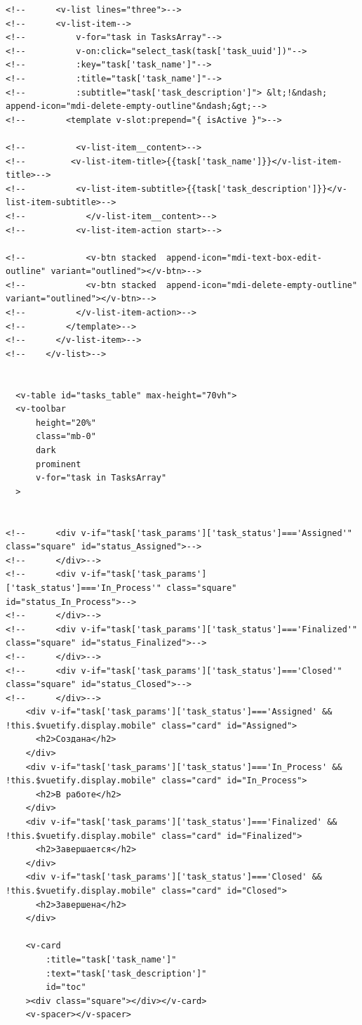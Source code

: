 \documentclass{altsu-report}
\begin{document}
\begin{code}
\begin{verbatim}
<!--      <v-list lines="three">-->
<!--      <v-list-item-->
<!--          v-for="task in TasksArray"-->
<!--          v-on:click="select_task(task['task_uuid'])"-->
<!--          :key="task['task_name']"-->
<!--          :title="task['task_name']"-->
<!--          :subtitle="task['task_description']"> &lt;!&ndash;  append-icon="mdi-delete-empty-outline"&ndash;&gt;-->
<!--        <template v-slot:prepend="{ isActive }">-->

<!--          <v-list-item__content>-->
<!--         <v-list-item-title>{{task['task_name']}}</v-list-item-title>-->
<!--          <v-list-item-subtitle>{{task['task_description']}}</v-list-item-subtitle>-->
<!--            </v-list-item__content>-->
<!--          <v-list-item-action start>-->

<!--            <v-btn stacked  append-icon="mdi-text-box-edit-outline" variant="outlined"></v-btn>-->
<!--            <v-btn stacked  append-icon="mdi-delete-empty-outline" variant="outlined"></v-btn>-->
<!--          </v-list-item-action>-->
<!--        </template>-->
<!--      </v-list-item>-->
<!--    </v-list>-->


  <v-table id="tasks_table" max-height="70vh">
  <v-toolbar
      height="20%"
      class="mb-0"
      dark
      prominent
      v-for="task in TasksArray"
  >


<!--      <div v-if="task['task_params']['task_status']==='Assigned'" class="square" id="status_Assigned">-->
<!--      </div>-->
<!--      <div v-if="task['task_params']['task_status']==='In_Process'" class="square" id="status_In_Process">-->
<!--      </div>-->
<!--      <div v-if="task['task_params']['task_status']==='Finalized'" class="square" id="status_Finalized">-->
<!--      </div>-->
<!--      <div v-if="task['task_params']['task_status']==='Closed'" class="square" id="status_Closed">-->
<!--      </div>-->
    <div v-if="task['task_params']['task_status']==='Assigned' && !this.$vuetify.display.mobile" class="card" id="Assigned">
      <h2>Создана</h2>
    </div>
    <div v-if="task['task_params']['task_status']==='In_Process' && !this.$vuetify.display.mobile" class="card" id="In_Process">
      <h2>В работе</h2>
    </div>
    <div v-if="task['task_params']['task_status']==='Finalized' && !this.$vuetify.display.mobile" class="card" id="Finalized">
      <h2>Завершается</h2>
    </div>
    <div v-if="task['task_params']['task_status']==='Closed' && !this.$vuetify.display.mobile" class="card" id="Closed">
      <h2>Завершена</h2>
    </div>

    <v-card
        :title="task['task_name']"
        :text="task['task_description']"
        id="toc"
    ><div class="square"></div></v-card>
    <v-spacer></v-spacer>


\end{verbatim}
\end{code}
\end{document}
